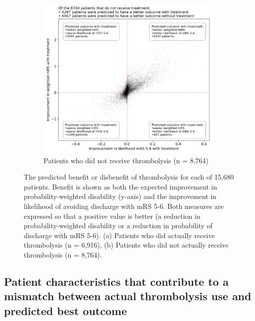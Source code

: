 \begin{figure}
\begin{subfigure}{.7\textwidth}
  \centering
  \captionsetup{width=.9\linewidth}
  \includegraphics[trim={0 0 0 1.7cm}, clip, width=1\linewidth]{./images/210_xgb_all_data_multiclass_outcome_scatter_criteria_not_treated}%
  \caption{\footnotesize{Patients who did not receive thrombolysis (n = 8,764)}}
  \label{fig:scatter_not_receive}
\end{subfigure}
  \caption{The predicted benefit or disbenefit of thrombolysis for each of 15,680 patients. Benefit is shown as both the expected improvement in probability-weighted disability (y-axis) and the improvement in likelihood of avoiding discharge with mRS 5-6. Both measures are expressed so that a positive value is better (a reduction in probability-weighted disability or a reduction in probability of discharge with mRS 5-6). (a) Patients who did actually receive thrombolysis (n = 6,916), (b) Patients who did not actually receive thrombolysis (n = 8,764).}
\label{fig:scatter_all}
\end{figure}


\subsection{Patient characteristics that contribute to a mismatch between actual thrombolysis use and predicted best outcome}

